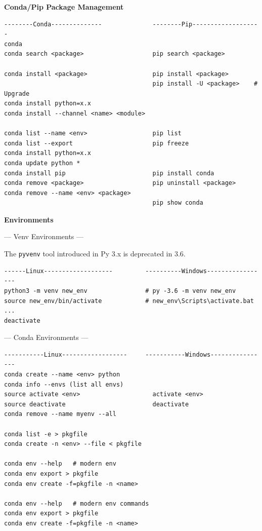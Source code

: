 \documentclass[9pt,a4wide]{extarticle}
\begin{document}
\medskip
{\bf Conda/Pip Package Management}

\begin{verbatim}
--------Conda--------------              --------Pip-------------------
conda 
conda search <package>                   pip search <package>

conda install <package>                  pip install <package>
                                         pip install -U <package>    # Upgrade
conda install python=x.x  
conda install --channel <name> <module>

conda list --name <env>                  pip list
conda list --export                      pip freeze
conda install python=x.x
conda update python *
conda install pip                        pip install conda
conda remove <package>                   pip uninstall <package>
conda remove --name <env> <package>
                                         pip show conda
\end{verbatim}



\medskip
{\bf Environments}

--- Venv Environments ---

The {\tt pyvenv} tool introduced in Py 3.x is deprecated in 3.6.

\begin{verbatim}
------Linux-------------------         ----------Windows-----------------
python3 -m venv new_env                # py -3.6 -m venv new_env 
source new_env/bin/activate            # new_env\Scripts\activate.bat 
...
deactivate
\end{verbatim}


--- Conda Environments ---

\begin{verbatim}
-----------Linux------------------     -----------Windows----------------
conda create --name <env> python         
conda info --envs (list all envs)        
source activate <env>                    activate <env>
source deactivate                        deactivate
conda remove --name myenv --all

conda list -e > pkgfile
conda create -n <env> --file < pkgfile
                                         
conda env --help   # modern env
conda env export > pkgfile 
conda env create -f=pkgfile -n <name>
                                         
conda env --help   # modern env commands
conda env export > pkgfile 
conda env create -f=pkgfile -n <name>
\end{verbatim}
\end{document}
